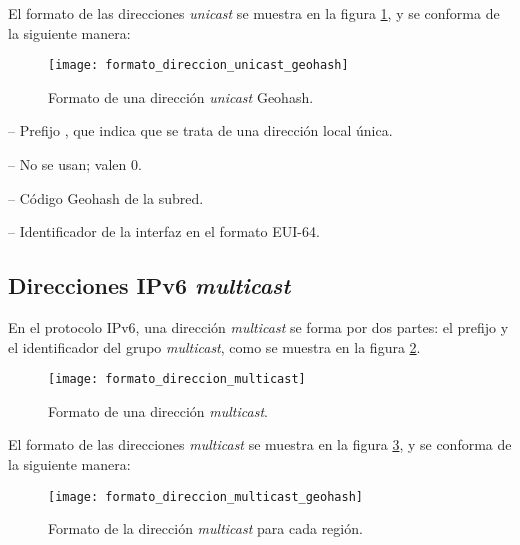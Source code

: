 El formato de las direcciones \textit{unicast} se muestra en la figura
\ref{fig:formato_direccion_unicast_geohash}, y se conforma de la siguiente
manera:

\begin{figure}[th!]
\centering
\texttt{[image: formato\_direccion\_unicast\_geohash]}
\decoRule
\caption[Formato de una dirección \textit{unicast} Geohash]{Formato de una
dirección \textit{unicast} Geohash.}
\label{fig:formato_direccion_unicast_geohash}
\end{figure}

 -- Prefijo , que indica que se trata de
una dirección local única.

 -- No se usan; valen 0.

 -- Código Geohash de la subred.

 -- Identificador de la interfaz en el formato
EUI-64.

\subsection{Direcciones IPv6 \textit{multicast}}
\label{subsec:direcciones_ipv6_multicast}

En el protocolo IPv6, una dirección \textit{multicast} se forma por dos partes:
el prefijo  y el identificador del grupo \textit{multicast},
como se muestra en la figura \ref{fig:formato_direccion_multicast}.

\begin{figure}[th!]
\centering
\texttt{[image: formato\_direccion\_multicast]}
\decoRule
\caption[Formato de una dirección \textit{multicast}]{Formato de una dirección
\textit{multicast}.}
\label{fig:formato_direccion_multicast}
\end{figure}

El formato de las direcciones \textit{multicast} se muestra en la figura
\ref{fig:formato_direccion_multicast_geohash}, y se conforma de la siguiente
manera:

\begin{figure}[th!]
\centering
\texttt{[image: formato\_direccion\_multicast\_geohash]}
\decoRule
\caption[Formato de la dirección \textit{multicast} para cada región]{Formato de
la dirección \textit{multicast} para cada región.}
\label{fig:formato_direccion_multicast_geohash}
\end{figure}

